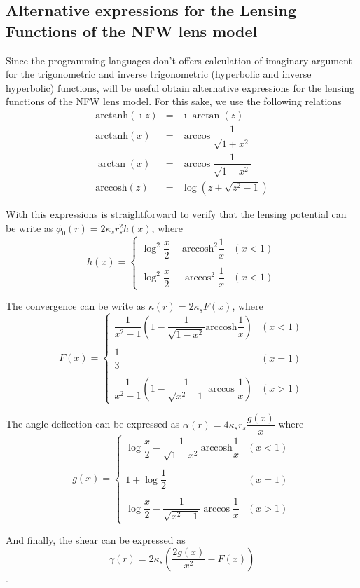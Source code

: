 \documentclass[a4paper,twoside,prd]{revtex4}
\def \ks {\kappa_s}
\def \rs {r_s}
\def \atanh {\mathrm{arctanh} }
\def \atan {\arctan}
\def \acosh {\mathrm{arccosh} }
\def \acos {\arccos}
\def \po {\phi_0}
\def \al {\alpha}
\begin{document}
\begin{appendix}

\section{Alternative expressions for the Lensing Functions of the NFW lens model}
Since the programming languages don't offers calculation of imaginary argument for the trigonometric and inverse trigonometric 
(hyperbolic and inverse hyperbolic) functions, will be useful obtain alternative expressions for the lensing functions of the 
NFW lens model. For this sake, we use the following relations
\begin{eqnarray}
\atanh(\imath z)&=&\imath\atan(z)\\
\atanh(x)&=&\acos{\dfrac{1}{\sqrt{1+x^2}}}\\
\atan(x)&=&\acos{\dfrac{1}{\sqrt{1-x^2}}}\\
\acosh(z)&=&\log{(z+\sqrt{z^2-1})}
\end{eqnarray}  

With this expressions is straightforward to verify that the lensing potential can be write as $\po(r)=2\ks\rs^2h(x)$, where
\begin{equation*}
h(x)=\left\{\begin{array}{lc}
\log^2{\dfrac{x}{2}}-\acosh^2{\dfrac{1}{x}} & (x<1)\\
\\
\log^2{\dfrac{x}{2}}+\acos^2{\dfrac{1}{x}} & (x<1)
\end{array}\right.
\end{equation*}

The convergence can be write as $\kappa(r)=2\ks F(x)$, where
\begin{equation*}
F(x)=\left\{\begin{array}{lc}
\dfrac{1}{x^2-1}\left(1-\dfrac{1}{\sqrt{1-x^2}}\acosh{\dfrac{1}{x}}\right) & (x<1)\\
\\
\dfrac{1}{3} & (x=1)\\
\\
\dfrac{1}{x^2-1}\left(1-\dfrac{1}{\sqrt{x^2-1}}\acos{\dfrac{1}{x}}\right) & (x>1)
\end{array}\right.
\end{equation*}

The angle deflection can be expressed as $\al(r)=4\ks\rs\dfrac{g(x)}{x}$ where
\begin{equation*}
g(x)=\left\{\begin{array}{lc}
\log{\dfrac{x}{2}}-\dfrac{1}{\sqrt{1-x^2}}\acosh{\dfrac{1}{x}} & (x<1)\\
\\
1+\log{\dfrac{1}{2}} & (x=1)\\
\\
\log{\dfrac{x}{2}}-\dfrac{1}{\sqrt{x^2-1}}\acos{\dfrac{1}{x}} & (x>1)
\end{array}\right.
\end{equation*}

And finally, the shear can be expressed as $$\gamma(r)=2\ks\left(\dfrac{2g(x)}{x^2}-F(x)\right)$$.


\end{appendix}
\end{document}
